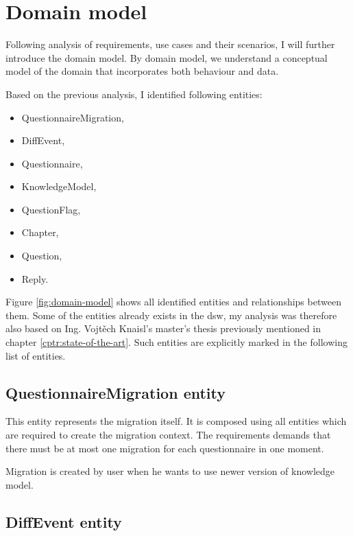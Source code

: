 \section{Domain model}\label{sec:domain-model}

Following analysis of requirements, use cases and their scenarios, I will further introduce the domain model.
By domain model, we understand a conceptual model of the domain that incorporates both behaviour and data\cite{wiki-domain-model}.

Based on the previous analysis, I identified following entities:

\begin{itemize}
    \item QuestionnaireMigration,
    \item DiffEvent,
    \item Questionnaire,
    \item KnowledgeModel,
    \item QuestionFlag,
    \item Chapter,
    \item Question,
    \item Reply.
\end{itemize}

Figure \ref{fig:domain-model} shows all identified entities and relationships between them.
Some of the entities already exists in the \gls{dsw}, my analysis was therefore also based on Ing. Vojtěch Knaisl's master's thesis\cite{mt-knails} previously mentioned in chapter \ref{cptr:state-of-the-art}.
Such entities are explicitly marked in the following list of entities.


\subsection{QuestionnaireMigration entity}

This entity represents the migration itself.
It is composed using all entities which are required to create the migration context.
The requirements demands that there must be at most one migration for each questionnaire in one moment.

Migration is created by user when he wants to use newer version of knowledge model.

\subsection{DiffEvent entity}

